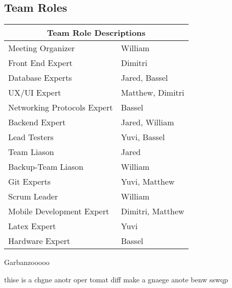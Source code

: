 \documentclass{article}
\begin{document}
\subsection{Team Roles}
\begin{tabular}{ |p{5cm}|p{8cm}| }
	\hline
	\multicolumn{2}{|c|}{Team Role Descriptions} \\
	\hline
	Meeting Organizer & William \\
	\hline
	Front End Expert & Dimitri \\
	\hline
	Database Experts  & Jared, Bassel \\
	\hline
	UX/UI Expert & Matthew, Dimitri \\
	\hline
	Networking Protocols Expert & Bassel \\
	\hline
	Backend Expert & Jared, William \\
	\hline
	Lead Testers & Yuvi, Bassel \\
	\hline
	Team Liason & Jared \\
	\hline
	Backup-Team Liason & William \\
	\hline
	Git Experts & Yuvi, Matthew\\
	\hline
	Scrum Leader & William \\
	\hline
	Mobile Development Expert & Dimitri, Matthew \\
	\hline
	Latex Expert & Yuvi \\
	\hline
	Hardware Expert & Bassel \\
	\hline
\end{tabular}

\subsdaksml

Garbanzooooo

thise is a chgne anotr oper tomat diff make a gnaege anote benw
 sswqp
\end{document}
